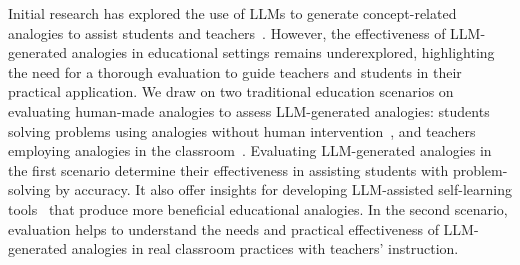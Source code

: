 Initial research has explored the use of LLMs to generate concept-related analogies to assist students and teachers~\cite{bhavya2024analego}.
However, the effectiveness of LLM-generated analogies in educational settings remains underexplored, highlighting the need for a thorough evaluation to guide teachers and students in their practical application. 
We draw on two traditional education scenarios on evaluating human-made analogies to assess LLM-generated analogies: students solving problems using analogies without human intervention~\cite{thagard_analogy_1992,gick_analogical_1980,gick_schema_1983, brown_analogical_1989}, and teachers employing analogies in the classroom~\cite{vendetti_analogical_2015,richland_analogy_2004,oliva_teaching_2007}.
Evaluating LLM-generated analogies in the first scenario determine their effectiveness in assisting students with problem-solving by accuracy.
It also offer insights for developing LLM-assisted self-learning tools~\cite{gao2024fine, Lyu2024evaluating} that produce more beneficial educational analogies.
In the second scenario, evaluation helps to understand the needs and practical effectiveness of LLM-generated analogies in real classroom practices with teachers' instruction.


